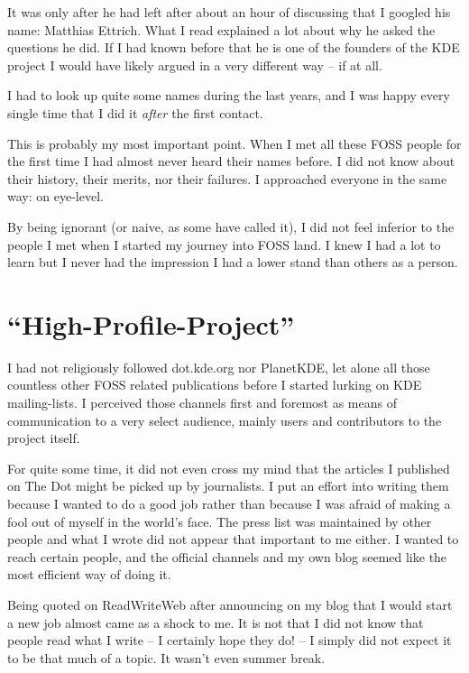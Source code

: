 It was only after he had left after about an hour of discussing that I googled his name: Matthias Ettrich. What I read explained a lot about why he asked the questions he did. If I had known before that he is one of the founders of the KDE project I would have likely argued in a very different way -- if at all.

I had to look up quite some names during the last years, and I was happy every single time that I did it \textit{after} the first contact.

This is probably my most important point. When I met all these FOSS people for the first time I had almost never heard their names before. I did not know about their history, their merits, nor their failures. I approached everyone in the same way: on eye-level. 

By being ignorant (or naive, as some have called it), I did not feel inferior to the people I met when I started my journey into FOSS land. I knew I had a lot to learn but I never had the impression I had a lower stand than others as a person.

\section*{``High-Profile-Project''}

I had not religiously followed dot.kde.org nor PlanetKDE, let alone all those countless other FOSS related publications before I started lurking on KDE mailing-lists. I perceived those channels first and foremost as means of communication to a very select audience, mainly users and contributors to the project itself. 

For quite some time, it did not even cross my mind that the articles I published on The Dot might be picked up by journalists. I put an effort into writing them because I wanted to do a good job rather than because I was afraid of making a fool out of myself in the world's face. The press list was maintained by other people and what I wrote did not appear that important to me either. I wanted to reach certain people, and the official channels and my own blog seemed like the most efficient way of doing it.

Being quoted on ReadWriteWeb after announcing on my blog that I would start a new job almost came as a shock to me. It is not that I did not know that people read what I write -- I certainly hope they do! -- I simply did not expect it to be that much of a topic. It wasn't even summer break.

